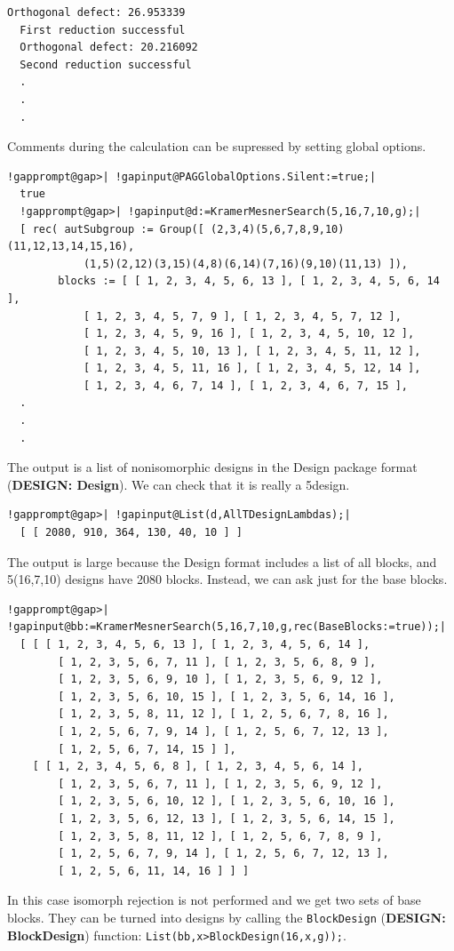 \documentclass[a4paper,11pt]{report}
\begin{document}
{{\begin{Verbatim}[commandchars=@|A,fontsize=\small,frame=single,label=Example]
  Orthogonal defect: 26.953339
  First reduction successful
  Orthogonal defect: 20.216092
  Second reduction successful
  .
  .
  .
\end{Verbatim}
 Comments during the calculation can be supressed by setting global options. 
\begin{Verbatim}[commandchars=!@|,fontsize=\small,frame=single,label=Example]
  !gapprompt@gap>| !gapinput@PAGGlobalOptions.Silent:=true;|
  true
  !gapprompt@gap>| !gapinput@d:=KramerMesnerSearch(5,16,7,10,g);|
  [ rec( autSubgroup := Group([ (2,3,4)(5,6,7,8,9,10)(11,12,13,14,15,16), 
            (1,5)(2,12)(3,15)(4,8)(6,14)(7,16)(9,10)(11,13) ]), 
        blocks := [ [ 1, 2, 3, 4, 5, 6, 13 ], [ 1, 2, 3, 4, 5, 6, 14 ], 
            [ 1, 2, 3, 4, 5, 7, 9 ], [ 1, 2, 3, 4, 5, 7, 12 ], 
            [ 1, 2, 3, 4, 5, 9, 16 ], [ 1, 2, 3, 4, 5, 10, 12 ], 
            [ 1, 2, 3, 4, 5, 10, 13 ], [ 1, 2, 3, 4, 5, 11, 12 ], 
            [ 1, 2, 3, 4, 5, 11, 16 ], [ 1, 2, 3, 4, 5, 12, 14 ], 
            [ 1, 2, 3, 4, 6, 7, 14 ], [ 1, 2, 3, 4, 6, 7, 15 ], 
  .
  .
  .
\end{Verbatim}
 The output is a list of non\texttt{}isomorphic designs in the \textsf{Design} package format  (\textbf{DESIGN: Design}). We can check that it is really a 5\texttt{}design. 
\begin{Verbatim}[commandchars=!@|,fontsize=\small,frame=single,label=Example]
  !gapprompt@gap>| !gapinput@List(d,AllTDesignLambdas);|
  [ [ 2080, 910, 364, 130, 40, 10 ] ]
\end{Verbatim}
 The output is large because the \textsf{Design} format includes a list of all blocks, and 5\texttt{}(16,7,10)
designs have 2080 blocks. Instead, we can ask just for the base blocks. 
\begin{Verbatim}[commandchars=!@|,fontsize=\small,frame=single,label=Example]
  !gapprompt@gap>| !gapinput@bb:=KramerMesnerSearch(5,16,7,10,g,rec(BaseBlocks:=true));|
  [ [ [ 1, 2, 3, 4, 5, 6, 13 ], [ 1, 2, 3, 4, 5, 6, 14 ], 
        [ 1, 2, 3, 5, 6, 7, 11 ], [ 1, 2, 3, 5, 6, 8, 9 ], 
        [ 1, 2, 3, 5, 6, 9, 10 ], [ 1, 2, 3, 5, 6, 9, 12 ], 
        [ 1, 2, 3, 5, 6, 10, 15 ], [ 1, 2, 3, 5, 6, 14, 16 ], 
        [ 1, 2, 3, 5, 8, 11, 12 ], [ 1, 2, 5, 6, 7, 8, 16 ], 
        [ 1, 2, 5, 6, 7, 9, 14 ], [ 1, 2, 5, 6, 7, 12, 13 ], 
        [ 1, 2, 5, 6, 7, 14, 15 ] ], 
    [ [ 1, 2, 3, 4, 5, 6, 8 ], [ 1, 2, 3, 4, 5, 6, 14 ], 
        [ 1, 2, 3, 5, 6, 7, 11 ], [ 1, 2, 3, 5, 6, 9, 12 ], 
        [ 1, 2, 3, 5, 6, 10, 12 ], [ 1, 2, 3, 5, 6, 10, 16 ], 
        [ 1, 2, 3, 5, 6, 12, 13 ], [ 1, 2, 3, 5, 6, 14, 15 ], 
        [ 1, 2, 3, 5, 8, 11, 12 ], [ 1, 2, 5, 6, 7, 8, 9 ], 
        [ 1, 2, 5, 6, 7, 9, 14 ], [ 1, 2, 5, 6, 7, 12, 13 ], 
        [ 1, 2, 5, 6, 11, 14, 16 ] ] ]
\end{Verbatim}
 In this case isomorph rejection is not performed and we get two sets of base
blocks. They can be turned into designs by calling the \texttt{BlockDesign} (\textbf{DESIGN: BlockDesign}) function: \texttt{List(bb,x\texttt{}{\textgreater}BlockDesign(16,x,g));}. }

}
\end{document}
